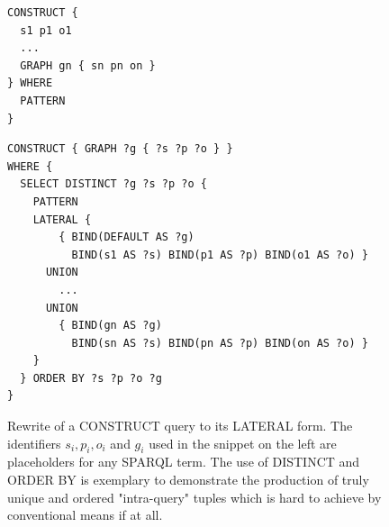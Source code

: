 


\begin{figure}[!h]
 \begin{minipage}[t]{0.29\textwidth}
  \centering
  \begin{lstlisting}[language=SPARQL]      
CONSTRUCT {
  s1 p1 o1
  ...
  GRAPH gn { sn pn on }
} WHERE
  PATTERN
}
  \end{lstlisting}
 \end{minipage}
 \begin{minipage}[t]{0.69\textwidth}
  \centering
  \begin{lstlisting}[language=SPARQL]
CONSTRUCT { GRAPH ?g { ?s ?p ?o } }
WHERE {
  SELECT DISTINCT ?g ?s ?p ?o {
    PATTERN
    LATERAL {
        { BIND(DEFAULT AS ?g)
          BIND(s1 AS ?s) BIND(p1 AS ?p) BIND(o1 AS ?o) }
      UNION
        ...
      UNION
        { BIND(gn AS ?g)
          BIND(sn AS ?s) BIND(pn AS ?p) BIND(on AS ?o) }      
    }
  } ORDER BY ?s ?p ?o ?g
}
  \end{lstlisting}
 \end{minipage}
 \vspace*{-5mm}
 \caption{Rewrite of a CONSTRUCT query to its LATERAL form. The identifiers $s_i, p_i, o_i$ and $g_i$ used in the snippet on the left are placeholders for any SPARQL term. The use of DISTINCT and ORDER BY is exemplary to demonstrate the production of truly unique and ordered "intra-query" tuples which is hard to achieve by conventional means if at all.}
\label{fig:construct-to-lateral}
\end{figure}



